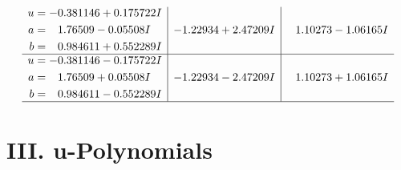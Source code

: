 \documentclass[1p]{elsarticle_modified}
\theoremstyle{definition}
\begin{document}
$$\begin{array}{c|c|c}
\begin{aligned}
u &= -0.381146 + 0.175722 I \\
a &= \phantom{-}1.76509 - 0.05508 I \\
b &= \phantom{-}0.984611 + 0.552289 I\end{aligned}
 & -1.22934 + 2.47209 I & \phantom{-}1.10273 - 1.06165 I \\ \hline\begin{aligned}
u &= -0.381146 - 0.175722 I \\
a &= \phantom{-}1.76509 + 0.05508 I \\
b &= \phantom{-}0.984611 - 0.552289 I\end{aligned}
 & -1.22934 - 2.47209 I & \phantom{-}1.10273 + 1.06165 I\\
 \hline 
 \end{array}$$\newpage
\newpage\renewcommand{\arraystretch}{1}
\centering \section*{ III. u-Polynomials}
\end{document}
